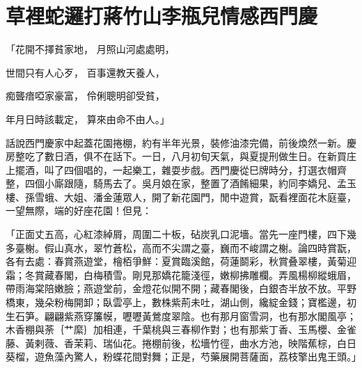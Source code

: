 %

\chapter{草裡蛇邏打蔣竹山\KG 李瓶兒情感西門慶}

\begin{showcontents}{}



「花開不擇貧家地，  月照山河處處明，

世間只有人心歹，  百事還教天養人，

痴聾瘖啞家豪富，  伶俐聰明卻受貧，

年月日時該載定，  算來由命不由人。」

話說西門慶家中起蓋花園捲棚，約有半年光景，裝修油漆完備，前後煥然一新。慶房整吃了數日酒，俱不在話下。一日，八月初旬天氣，與夏提刑做生日。在新買庄上擺酒，叫了四個唱的，一起樂工，雜耍步戲。西門慶從巳牌時分，打選衣帽齊整，四個小廝跟隨，騎馬去了。吳月娘在家，整置了酒餚細果，約同李嬌兒、孟玉樓、孫雪蛾、大姐、潘金蓮眾人，開了新花園門，閒中遊賞，翫看裡面花木庭臺，一望無際，端的好座花園！但見：

「正面丈五高，心紅漆綽屑，周圍二十板，砧炭乳口泥墻。當先一座門樓，四下幾多臺榭。假山真水，翠竹蒼松，高而不尖謂之臺，巍而不峻謂之榭。論四時賞翫，各有去處：春賞燕遊堂，檜栢爭鮮：夏賞臨溪館，荷蓮鬬彩，秋賞叠翠樓，黃菊迎霜；冬賞藏春閣，白梅積雪。剛見那嬌花籠淺徑，嫩柳拂雕欄。弄風楊柳縱蛾眉，帶雨海棠陪嫩臉；燕遊堂前，金燈花似開不開；藏春閣後，白銀杏半放不放。平野橋東，幾朵粉梅開卸；臥雲亭上，數株紫荊未吐，湖山側，纔綻金錢；寶檻邊，初生石笋。翩翩紫燕穿簾幙，嚦嚦黃鶯度翠陰。也有那月窗雪洞，也有那水閣風亭；木香棚與荼｛艹縻｝加相連，千葉桃與三春柳作對；也有那紫丁香、玉馬櫻、金雀藤、黃剌薇、香茉莉、瑞仙花。捲棚前後，松墻竹徑，曲水方池，映階蕉棕，白日葵榴，遊魚藻內驚人，粉蝶花間對舞；正是，芍藥展開菩薩面，荔枝擎出鬼王頭。」


\end{showcontents}
